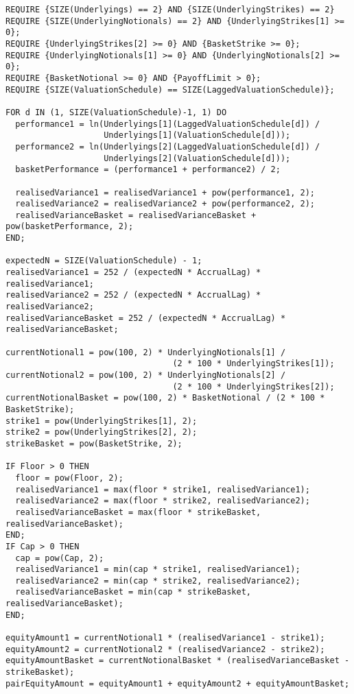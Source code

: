 \begin{listing}[hbt]
\begin{verbatim}
REQUIRE {SIZE(Underlyings) == 2} AND {SIZE(UnderlyingStrikes) == 2}
REQUIRE {SIZE(UnderlyingNotionals) == 2} AND {UnderlyingStrikes[1] >= 0};
REQUIRE {UnderlyingStrikes[2] >= 0} AND {BasketStrike >= 0};
REQUIRE {UnderlyingNotionals[1] >= 0} AND {UnderlyingNotionals[2] >= 0};
REQUIRE {BasketNotional >= 0} AND {PayoffLimit > 0};
REQUIRE {SIZE(ValuationSchedule) == SIZE(LaggedValuationSchedule)};

FOR d IN (1, SIZE(ValuationSchedule)-1, 1) DO
  performance1 = ln(Underlyings[1](LaggedValuationSchedule[d]) /
                    Underlyings[1](ValuationSchedule[d]));
  performance2 = ln(Underlyings[2](LaggedValuationSchedule[d]) /
                    Underlyings[2](ValuationSchedule[d]));
  basketPerformance = (performance1 + performance2) / 2;
  
  realisedVariance1 = realisedVariance1 + pow(performance1, 2);
  realisedVariance2 = realisedVariance2 + pow(performance2, 2);
  realisedVarianceBasket = realisedVarianceBasket + pow(basketPerformance, 2);
END;

expectedN = SIZE(ValuationSchedule) - 1;
realisedVariance1 = 252 / (expectedN * AccrualLag) * realisedVariance1;
realisedVariance2 = 252 / (expectedN * AccrualLag) * realisedVariance2;
realisedVarianceBasket = 252 / (expectedN * AccrualLag) * realisedVarianceBasket;

currentNotional1 = pow(100, 2) * UnderlyingNotionals[1] /
                                  (2 * 100 * UnderlyingStrikes[1]);
currentNotional2 = pow(100, 2) * UnderlyingNotionals[2] /
                                  (2 * 100 * UnderlyingStrikes[2]);
currentNotionalBasket = pow(100, 2) * BasketNotional / (2 * 100 * BasketStrike);
strike1 = pow(UnderlyingStrikes[1], 2);
strike2 = pow(UnderlyingStrikes[2], 2);
strikeBasket = pow(BasketStrike, 2);

IF Floor > 0 THEN
  floor = pow(Floor, 2);
  realisedVariance1 = max(floor * strike1, realisedVariance1);
  realisedVariance2 = max(floor * strike2, realisedVariance2);
  realisedVarianceBasket = max(floor * strikeBasket, realisedVarianceBasket);
END;
IF Cap > 0 THEN
  cap = pow(Cap, 2);
  realisedVariance1 = min(cap * strike1, realisedVariance1);
  realisedVariance2 = min(cap * strike2, realisedVariance2);
  realisedVarianceBasket = min(cap * strikeBasket, realisedVarianceBasket);
END;

equityAmount1 = currentNotional1 * (realisedVariance1 - strike1);
equityAmount2 = currentNotional2 * (realisedVariance2 - strike2);
equityAmountBasket = currentNotionalBasket * (realisedVarianceBasket - strikeBasket);
pairEquityAmount = equityAmount1 + equityAmount2 + equityAmountBasket;


\end{verbatim}
\end{listing}
